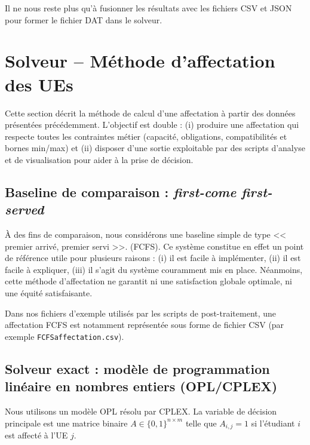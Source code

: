 \documentclass{rapport}
\theoremstyle{definition}
\theoremstyle{remark}
\theoremstyle{plain}
\theoremstyle{definition}
\theoremstyle{definition}
\theoremstyle{remark}
\theoremstyle{definition}
\begin{document}
Il ne nous reste plus qu'à fusionner les résultats avec les fichiers CSV et JSON pour former le fichier DAT dans le solveur.

\section{Solveur -- Méthode d'affectation des UEs}

Cette section décrit la méthode de calcul d'une affectation à partir des données présentées précédemment. L'objectif est double : (i) produire une affectation qui respecte toutes les contraintes métier (capacité, obligations, compatibilités et bornes min/max) et (ii) disposer d'une sortie exploitable par des scripts d'analyse et de visualisation pour aider à la prise de décision.

\subsection{Baseline de comparaison : \textit{first-come first-served}}

À des fins de comparaison, nous considérons une baseline simple de type << premier arrivé, premier servi >>. (FCFS). Ce système constitue en effet un point de référence utile pour plusieurs raisons :
(i) il est facile à implémenter, (ii) il est facile à expliquer,
(iii) il s'agit du système couramment mis en place. Néanmoins, cette méthode d'affectation ne garantit ni une satisfaction globale optimale, ni une équité satisfaisante.

Dans nos fichiers d'exemple utilisés par les scripts de post-traitement, une affectation FCFS est notamment représentée sous forme de fichier CSV (par exemple \texttt{FCFSaffectation.csv}).

\subsection{Solveur exact : modèle de programmation linéaire en nombres entiers (OPL/CPLEX)}

Nous utilisons un modèle OPL résolu par CPLEX. La variable de décision principale est une matrice binaire $A \in \{0,1\}^{n\times m}$ telle que $A_{i,j}=1$ si l'étudiant $i$ est affecté à l'UE $j$.
\end{document}
